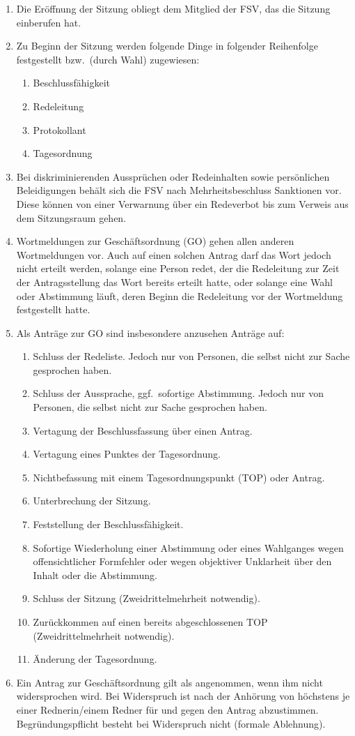 \documentclass[
	a4paper,
	12pt,
	oneside,
	parskip=half-,
	pagesize,
	headsepline,
	german,
	ngerman
]{scrartcl}
\begin{document}
\begin{enumerate}
	\item Die Eröffnung der Sitzung obliegt dem Mitglied der FSV, das die Sitzung einberufen hat.
	\item Zu Beginn der Sitzung werden folgende Dinge in folgender Reihenfolge festgestellt bzw.\ (durch Wahl) zugewiesen:
	\begin{enumerate}
		\item Beschlussfähigkeit
		\item Redeleitung
		\item Protokollant
		\item Tagesordnung
	\end{enumerate}
	\item Bei diskriminierenden Aussprüchen oder Redeinhalten sowie persönlichen Beleidigungen behält sich die FSV nach Mehrheitsbeschluss Sanktionen vor. Diese können von einer Verwarnung über ein Redeverbot bis zum Verweis aus dem Sitzungsraum gehen.
	\item Wortmeldungen zur Geschäftsordnung (GO) gehen allen anderen Wortmeldungen vor. Auch auf einen solchen Antrag darf das Wort jedoch nicht erteilt werden, solange eine Person redet, der die Redeleitung zur Zeit der Antragsstellung das Wort bereits erteilt hatte, oder solange eine Wahl oder Abstimmung läuft, deren Beginn die Redeleitung vor der Wortmeldung festgestellt hatte.
	\item Als Anträge zur GO sind insbesondere anzusehen Anträge auf:
	\begin{enumerate}
		\item Schluss der Redeliste. Jedoch nur von Personen, die selbst nicht zur Sache gesprochen haben.
		\item Schluss der Aussprache, ggf.\ sofortige Abstimmung. Jedoch nur von Personen, die selbst nicht zur Sache gesprochen haben.
		\item Vertagung der Beschlussfassung über einen Antrag.
		\item Vertagung eines Punktes der Tagesordnung.
		\item Nichtbefassung mit einem Tagesordnungspunkt (TOP) oder Antrag.
		\item Unterbrechung der Sitzung.
		\item Feststellung der Beschlussfähigkeit.
		\item Sofortige Wiederholung einer Abstimmung oder eines Wahlganges wegen offensichtlicher Formfehler oder wegen objektiver Unklarheit über den Inhalt oder die Abstimmung.
		\item Schluss der Sitzung (Zweidrittelmehrheit notwendig).
		\item Zurückkommen auf einen bereits abgeschlossenen TOP (Zweidrittelmehrheit notwendig).
		\item Änderung der Tagesordnung.
	\end{enumerate}
	\item Ein Antrag zur Geschäftsordnung gilt als angenommen, wenn ihm nicht widersprochen wird. Bei Widerspruch ist nach der Anhörung von höchstens je einer Rednerin/einem Redner für und gegen den Antrag abzustimmen. Begründungspflicht besteht bei Widerspruch nicht (formale Ablehnung).
\end{enumerate}
\end{document}

